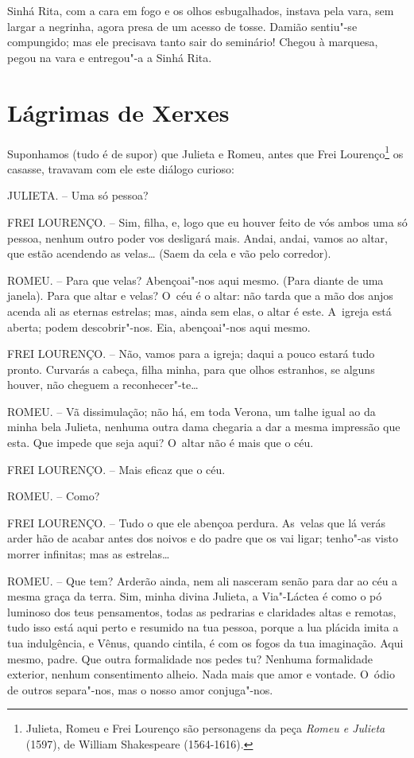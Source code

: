 Sinhá Rita, com a cara em fogo e os olhos esbugalhados, instava pela
vara, sem largar a negrinha, agora presa de um acesso de tosse. Damião
sentiu"-se compungido; mas ele precisava tanto sair do seminário! Chegou
à marquesa, pegou na vara e entregou"-a a Sinhá Rita.

\chapter{Lágrimas de Xerxes}

Suponhamos (tudo é de supor) que Julieta e Romeu, antes que Frei
Lourenço\footnote{Julieta, Romeu e Frei Lourenço são personagens da peça
  \emph{Romeu e Julieta} (1597), de William Shakespeare (1564-1616).} os
casasse, travavam com ele este diálogo curioso:

JULIETA. -- Uma só pessoa?

FREI LOURENÇO. -- Sim, filha, e, logo que eu houver feito de vós ambos
uma só pessoa, nenhum outro poder vos desligará mais. Andai, andai,
vamos ao altar, que estão acendendo as velas\ldots{} (Saem da cela e vão pelo
corredor).

ROMEU. -- Para que velas? Abençoai"-nos aqui mesmo. (Para diante de uma
janela). Para que altar e velas? O~céu é o altar: não tarda que a mão
dos anjos acenda ali as eternas estrelas; mas, ainda sem elas, o altar é
este. A~igreja está aberta; podem descobrir"-nos. Eia, abençoai"-nos aqui
mesmo.

FREI LOURENÇO. -- Não, vamos para a igreja; daqui a pouco estará tudo
pronto. Curvarás a cabeça, filha minha, para que olhos estranhos, se
alguns houver, não cheguem a reconhecer"-te\ldots{}

ROMEU. -- Vã dissimulação; não há, em toda Verona, um talhe igual ao da
minha bela Julieta, nenhuma outra dama chegaria a dar a mesma impressão
que esta. Que impede que seja aqui? O~altar não é mais que o céu.

FREI LOURENÇO. -- Mais eficaz que o céu.

ROMEU. -- Como?

FREI LOURENÇO. -- Tudo o que ele abençoa perdura. As~velas que lá verás
arder hão de acabar antes dos noivos e do padre que os vai ligar;
tenho"-as visto morrer infinitas; mas as estrelas\ldots{}

ROMEU. -- Que tem? Arderão ainda, nem ali nasceram senão para dar ao céu
a mesma graça da terra. Sim, minha divina Julieta, a Via"-Láctea é como o
pó luminoso dos teus pensamentos, todas as pedrarias e claridades altas
e remotas, tudo isso está aqui perto e resumido na tua pessoa, porque a
lua plácida imita a tua indulgência, e Vênus, quando cintila, é com os
fogos da tua imaginação. Aqui mesmo, padre. Que outra formalidade nos
pedes tu? Nenhuma formalidade exterior, nenhum consentimento alheio.
Nada mais que amor e vontade. O~ódio de outros separa"-nos, mas o nosso
amor conjuga"-nos.


